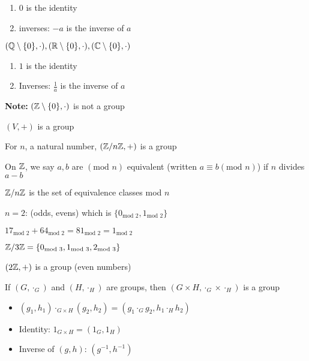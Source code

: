 \begin{enumerate}
  \item $0$ is the identity
  \item inverses: $-a$ is the inverse of $a$
\end{enumerate}

\begin{example*}
  $(\mathbb Q \setminus \{0\}, \cdot), (\mathbb R \setminus \{0\}, \cdot), (\mathbb C \setminus \{0\}, \cdot)$ 
\end{example*}

\begin{enumerate}
  \item $1$ is the identity
  \item Inverses: $\frac{1}{a}$ is the inverse of $a$
\end{enumerate}

\textbf{Note:} $(\mathbb Z \setminus \{0\}, \cdot)$ is not a group

$(V, +)$ is a group

\begin{example*}
  For $n$, a natural number, $(\mathbb Z/n\mathbb Z, +)$ is a group
\end{example*}

On $\mathbb Z$, we say $a, b$ are $(\text{mod } n)$ equivalent (written $a \equiv b (\text{mod } n)$) 
if $n$ divides $a-b$

$\mathbb Z/n\mathbb Z$ is the set of equivalence classes mod $n$

\begin{example*}
  $n = 2$: (odds, evens) which is $\{0_{\text{mod } 2}, 1_{\text{mod } 2}\}$
\end{example*}

$17_{\text{mod } 2} + 64_{\text{mod } 2} = 81_{\text{mod } 2} = 1_{\text{mod } 2}$

\begin{example*}
  $\mathbb Z/3\mathbb Z = \{0_{\text{mod } 3}, 1_{\text{mod } 3}, 2_{\text{mod } 3}\}$
\end{example*}

\begin{example*}
  $(2\mathbb Z, +)$ is a group (even numbers)
\end{example*}

\begin{example*}
  If $(G, \cdot_G)$ and $(H, \cdot_H)$ are groups, then $(G \times H, \cdot_{G} \times \cdot_H)$ is a group
\end{example*}

\begin{itemize}
  \item $(g_1, h_1) \cdot_{G \times H} (g_2, h_2) = (g_1 \cdot_G g_2, h_1 \cdot_H h_2)$
  \item Identity: $1_{G \times H} = (1_G, 1_H)$
  \item Inverse of $(g, h)$: $(g^{-1}, h^{-1})$ 
\end{itemize}

